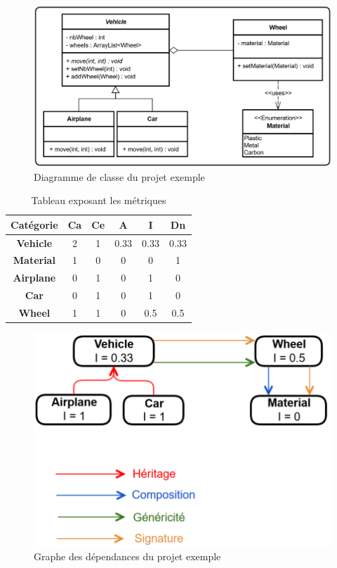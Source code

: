 \documentclass{scrartcl}
\begin{document}
\begin{appendices}
\begin{figure}[h!]
    \centering
    \includegraphics[scale=0.5]{img/uml_example.png}
    \caption{Diagramme de classe du projet exemple}
\end{figure}


\begin{table}[H]\caption{Tableau exposant les métriques}
    \centering
    \begin{tabular}{|c|c|c|c|c|c|}
        \hline
        \textbf{Catégorie} & \textbf{Ca} & \textbf{Ce} & \textbf{A} & \textbf{I} & \textbf{Dn} \\
        \hline
        \textbf{Vehicle} & 2 & 1 & 0.33 & 0.33 & 0.33 \\
        \hline
        \textbf{Material} & 1 & 0 & 0 & 0 & 1 \\
        \hline
        \textbf{Airplane} & 0 & 1 & 0 & 1 & 0  \\
        \hline
        \textbf{Car} & 0 & 1 & 0 & 1 & 0 \\
        \hline
        \textbf{Wheel} & 1 & 1 & 0 & 0.5 & 0.5 \\
        \hline
    \end{tabular}
\end{table}


\begin{figure}
    \centering
    \includegraphics[scale=0.5]{img/gdd_example.png}
    \caption{Graphe des dépendances du projet exemple}
\end{figure}

\end{appendices}
\end{document}
